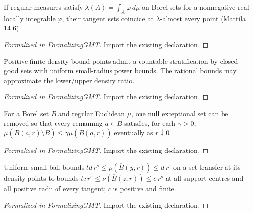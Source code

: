 \begin{theorem}
\label{thm:matching}
\leanok
{}
If regular measures satisfy $\lambda(A)=\int_A\varphi\,d\mu$ on Borel sets for a nonnegative real locally integrable $\varphi$, their tangent sets coincide at $\lambda$-almost every point (Mattila 14.6).
\end{theorem}
\begin{proof}[Formalized in FormalizingGMT]
\leanok
{}
Import the existing declaration.
\end{proof}

\begin{lemma}
\label{gmt:goodsets}
\leanok
{}
Positive finite density-bound points admit a countable stratification by closed good sets with uniform small-radius power bounds. The rational bounds may approximate the lower/upper density ratio.
\end{lemma}
\begin{proof}[Formalized in FormalizingGMT]
\leanok
{}
Import the existing declaration.
\end{proof}

\begin{lemma}
\label{gmt:density-points}
\leanok
For a Borel set $B$ and regular Euclidean $\mu$, one null exceptional set can be removed so that every remaining $a\in B$ satisfies, for each $\gamma>0$, $\mu(\overline B(a,r)\setminus B)\leq\gamma\mu(\overline B(a,r))$ eventually as $r\downarrow0$.
\end{lemma}
\begin{proof}[Formalized in FormalizingGMT]
\leanok
Import the existing declaration.
\end{proof}

\begin{theorem}
\label{gmt:transfer-ball-bounds}
\leanok
{}
Uniform small-ball bounds $td\,r^s\leq\mu(\overline B(y,r))\leq d\,r^s$ on a set transfer at its density points to bounds $tc\,r^s\leq\nu(\overline B(z,r))\leq c\,r^s$ at all support centres and all positive radii of every tangent; $c$ is positive and finite.
\end{theorem}
\begin{proof}[Formalized in FormalizingGMT]
\leanok
{}
Import the existing declaration.
\end{proof}

